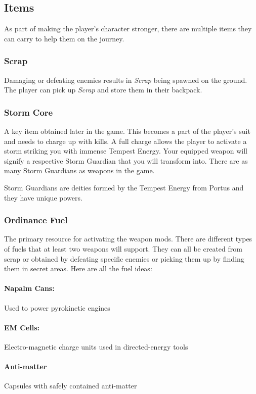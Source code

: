 \documentclass[../Main.tex]{subfiles}
\begin{document}
\subsection{Items}

As part of making the player's character stronger, there are multiple items they can carry to help them on the journey.

\subsubsection{Scrap}

Damaging or defeating enemies results in \emph{Scrap} being spawned on the ground. The player can pick up \emph{Scrap} and store them in their backpack. 

\subsubsection{Storm Core}

A key item obtained later in the game. This becomes a part of the player's suit and needs to charge up with kills. A full charge allows the player to activate a storm striking you with immense Tempest Energy. Your equipped weapon will signify a respective Storm Guardian that you will transform into. There are as many Storm Guardians as weapons in the game. 

Storm Guardians are deities formed by the Tempest Energy from Portus and they have unique powers.

\subsubsection{Ordinance Fuel}

The primary resource for activating the weapon mods. There are different types of fuels that at least two weapons will support. They can all be created from scrap or obtained by defeating specific enemies or picking them up by finding them in secret areas. Here are all the fuel ideas:

\paragraph{Napalm Cans:} Used to power pyrokinetic engines

\paragraph{EM Cells:} Electro-magnetic charge units used in directed-energy tools

\paragraph{Anti-matter} Capsules with safely contained anti-matter
\end{document}

